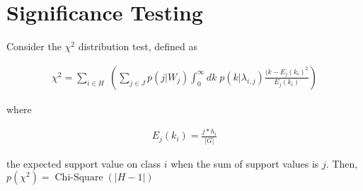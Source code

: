 \documentclass[a4paper,10pt]{article}
\begin{document}
\section{Significance Testing}
Consider the $\chi^2$ distribution test, defined as

\begin{align*}
  \chi^2 = \sum_{i \in H}\; \left( \sum_{j \in J}p(j|W_j) \int_0^{\infty}dk\; p(k|\lambda_{i,j}) \frac{(k-E_j(k_i)^2}{E_j(k_i)} \right)
\end{align*}

where 

\begin{align*}
  E_j(k_i) = \frac{j * h_i}{\vert G\vert}
\end{align*}

the expected support value on class $i$ when the sum of support values is $j$. Then, $p(\chi^2)=\operatorname{Chi-Square}\left(\vert H-1\vert\right)$
\end{document}
